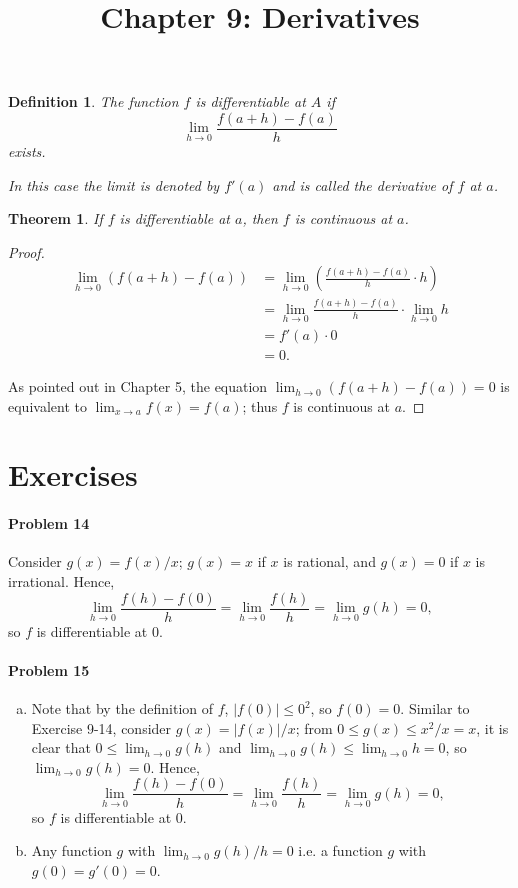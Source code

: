 \documentclass{article}
\newtheorem{definition}{Definition}
\newtheorem{theorem}{Theorem}
\begin{document}
\title{Chapter 9: Derivatives}
\maketitle

\begin{definition}
  The function $f$ is \emph{differentiable at $A$} if \[
    \lim_{h \to 0}\frac{f(a + h) - f(a)}{h}
  \] exists.

  In this case the limit is denoted by $f'(a)$ and is called the
  \emph{derivative of $f$ at $a$}.
\end{definition}

\begin{theorem}
  If $f$ is differentiable at $a$, then $f$ is continuous at $a$.
\end{theorem}
\begin{proof}
  \begin{align*}
    \lim_{h \to 0} (f(a + h) - f(a))
    &= \lim_{h \to 0} \left( \frac{f(a + h) - f(a)}{h} \cdot h \right) \\
    &= \lim_{h \to 0} \frac{f(a + h) - f(a)}{h} \cdot \lim_{h \to 0} h \\
    &= f'(a) \cdot 0 \\
    &= 0.
  \end{align*}

  As pointed out in Chapter 5, the equation $\lim_{h \to 0} (f(a + h) - f(a)) =
  0$ is equivalent to $\lim_{x \to a} f(x) = f(a)$; thus $f$ is continuous at
  $a$.
\end{proof}

\section*{Exercises}

\paragraph{Problem 14} Consider $g(x) = f(x)/x$; $g(x) = x$ if $x$ is rational,
and $g(x) = 0$ if $x$ is irrational. Hence, \[
  \lim_{h \to 0} \frac{f(h) - f(0)}{h}
  = \lim_{h \to 0} \frac{f(h)}{h}
  = \lim_{h \to 0} g(h) = 0,
\] so $f$ is differentiable at 0.

\paragraph{Problem 15}
\begin{enumerate}[(a)]
  \item Note that by the definition of $f$, $|f(0)| \leq 0^2$, so $f(0) = 0$.
    Similar to Exercise 9-14, consider $g(x) = |f(x)|/x$; from $0 \leq g(x)
    \leq x^2/x = x$, it is clear that $0 \leq \lim_{h \to 0} g(h)$ and
    $\lim_{h \to 0} g(h) \leq \lim_{h \to 0} h = 0$, so $\lim_{h \to 0} g(h) =
    0$. Hence, \[
      \lim_{h \to 0} \frac{f(h) - f(0)}{h}
      = \lim_{h \to 0} \frac{f(h)}{h}
      = \lim_{h \to 0} g(h) = 0,
    \] so $f$ is differentiable at 0.
  \item Any function $g$ with $\lim_{h \to 0} g(h)/h = 0$ i.e. a function $g$
    with $g(0) = g'(0) = 0$.
\end{enumerate}
\end{document}
